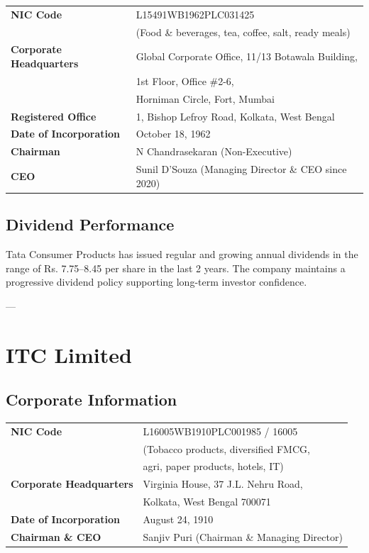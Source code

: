 \documentclass[12pt, a4paper]{report}
\begin{document}
\begin{tabular}{ll}
    \textbf{NIC Code} & L15491WB1962PLC031425 \\
                      & (Food \& beverages, tea, coffee, salt, ready meals) \\
    \textbf{Corporate Headquarters} & Global Corporate Office, 11/13 Botawala Building, \\
                                    & 1st Floor, Office \#2-6, \\
                                    & Horniman Circle, Fort, Mumbai \\
    \textbf{Registered Office} & 1, Bishop Lefroy Road, Kolkata, West Bengal \\
    \textbf{Date of Incorporation} & October 18, 1962 \\
    \textbf{Chairman} & N Chandrasekaran (Non-Executive) \\
    \textbf{CEO} & Sunil D'Souza (Managing Director \& CEO since 2020) \\
\end{tabular}

\subsection{Dividend Performance}

Tata Consumer Products has issued regular and growing annual dividends in the range of Rs. 7.75–8.45 per share in the last 2 years. The company maintains a progressive dividend policy supporting long-term investor confidence.

---

\section{ITC Limited}

\subsection{Corporate Information}

\begin{tabular}{ll}
    \textbf{NIC Code} & L16005WB1910PLC001985 / 16005 \\
                      & (Tobacco products, diversified FMCG, \\
                      & agri, paper products, hotels, IT) \\
    \textbf{Corporate Headquarters} & Virginia House, 37 J.L. Nehru Road, \\
                                    & Kolkata, West Bengal 700071 \\
    \textbf{Date of Incorporation} & August 24, 1910 \\
    \textbf{Chairman \& CEO} & Sanjiv Puri (Chairman \& Managing Director) \\
\end{tabular}
\end{document}
